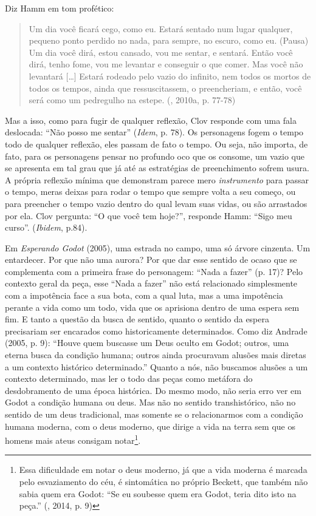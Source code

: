 Diz Hamm em tom profético:

\begin{quote}
Um dia você ficará cego, como eu. Estará sentado num lugar qualquer,
pequeno ponto perdido no nada, para sempre, no escuro, como eu. (Pausa)
Um dia você dirá, estou cansado, vou me sentar, e sentará. Então você
dirá, tenho fome, vou me levantar e conseguir o que comer. Mas você não
levantará [\ldots{}] Estará rodeado pelo vazio do infinito, nem
todos os mortos de todos os tempos, ainda que ressuscitassem, o
preencheriam, e então, você será como um pedregulho na estepe. (,
2010a, p. 77-78)
\end{quote}

Mas a isso, como para fugir de qualquer reflexão, Clov responde com uma
fala deslocada: ``Não posso me sentar'' (\emph{Idem}, p. 78). Os
personagens fogem o tempo todo de qualquer reflexão, eles passam de fato
o tempo. Ou seja, não importa, de fato, para os personagens pensar no
profundo oco que os consome, um vazio que se apresenta em tal grau que
já até as estratégias de preenchimento sofrem usura. A própria reflexão
mínima que demonstram parece mero \emph{instrumento} para passar o
tempo, meras deixas para rodar o tempo que sempre volta a seu começo, ou
para preencher o tempo vazio dentro do qual levam suas vidas, ou são
arrastados por ela. Clov pergunta: ``O que você tem hoje?'', responde
Hamm: ``Sigo meu curso''. (\emph{Ibidem}, p.84).

Em \emph{Esperando Godot} (2005), uma estrada no campo, uma só árvore
cinzenta. Um entardecer. Por que não uma aurora? Por que dar esse
sentido de ocaso que se complementa com a primeira frase do personagem:
``Nada a fazer'' (p. 17)? Pelo contexto geral da peça, esse ``Nada a
fazer'' não está relacionado simplesmente com a impotência face a sua
bota, com a qual luta, mas a uma impotência perante a vida como um todo,
vida que os aprisiona dentro de uma espera sem fim. E tanto a questão da
busca de sentido, quanto o sentido da espera precisariam ser encarados
como historicamente determinados. Como diz Andrade (2005, p. 9): ``Houve
quem buscasse um Deus oculto em Godot; outros, uma eterna busca da
condição humana; outros ainda procuravam alusões mais diretas a um
contexto histórico determinado.'' Quanto a nós, não buscamos alusões a
um contexto determinado, mas ler o todo das peças como metáfora do
desdobramento de uma época histórica. Do mesmo modo, não seria erro ver
em Godot a condição humana ou deus. Mas não no sentido transhistórico,
não no sentido de um deus tradicional, mas somente se o relacionarmos
com a condição humana moderna, com o deus moderno, que dirige a vida na
terra sem que os homens mais ateus consigam notar\footnote{Essa
  dificuldade em notar o deus moderno, já que a vida moderna é marcada
  pelo esvaziamento do céu, é sintomática no próprio Beckett, que também
  não sabia quem era Godot: ``Se eu soubesse quem era Godot, teria dito
  isto na peça.'' (, 2014, p. 9)}.

